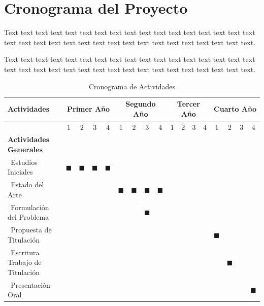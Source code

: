 \documentclass[12pt,a4paper]{article}
\begin{document}
\section{Cronograma del Proyecto}
Text text text text text text text text text text text  text text text text text text text text text text text text text text text text text text text text text text text.

Text text text text text text text text text text text  text text text text text text text text text text text text text text text text text text text text text text text.

\clearpage

\begin{table}[H]
\caption{Cronograma de Actividades}
\begin{center}
\begin{tabular}{|p{4.0cm}|c|c|c|c|c|c|c|c|c|c|c|c|c|c|c|c|}
\hline
Actividades &                  \multicolumn{ 4}{|c}{Primer Año} &                 \multicolumn{ 4}{|c}{Segundo Año} &                  \multicolumn{ 4}{|c}{Tercer Año} &                 \multicolumn{ 4}{|c|}{Cuarto Año} \\
\hline
 & $1$ & $2$ & $3$ & $4$ & $1$ & $2$ & $3$ & $4$ & $1$ & $2$ & $3$ & $4$ & $1$ & $2$ & $3$ & $4$ \\
\hline
\hline
\textbf{Actividades Generales}  &  &  &  &  &      &  &  &  &      &  &  &  &      &  &  &  \\ \hline
$~~$Estudios Iniciales    & $\blacksquare$ & $\blacksquare$ & $\blacksquare$ & $\blacksquare$ &      &  &  &  &      &  &  &  &      &  &  &  \\ \hline
$~~$Estado del Arte   &  &  &  &  &     $\blacksquare$ & $\blacksquare$ & $\blacksquare$ & $\blacksquare$ &      &  &  &  &      &  &  &  \\ \hline
$~~$Formulación del Problema   &  &  &  &  &      &  & $\blacksquare$ &  &      &  &  &  &      &  &  &  \\ \hline
$~~$Propuesta de Titulación   &  &  &  &  &      &  &  &  &      &  &  &  &     $\blacksquare$ &  &  &  \\ \hline
$~~$Escritura Trabajo de Titulación      &  &  &  &  &      &  &  &  &      &  &  &  &      & $\blacksquare$ &  &  \\ \hline
$~~$Presentación Oral      &  &  &  &  &      &  &  &  &      &  &  &  &      &  &  & $\blacksquare$ \\ \hline \hline


\end{tabular}
\end{center}
\end{table}
\end{document}
